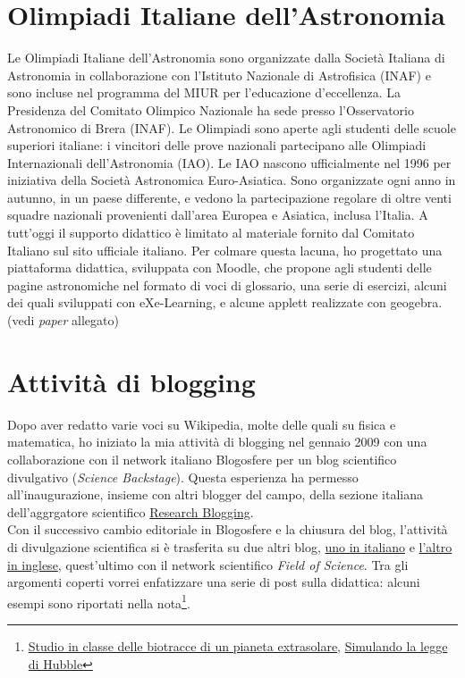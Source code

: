\documentclass[a4paper,latin1,italian]{article}
\begin{document}
\section{Olimpiadi Italiane dell'Astronomia}
Le Olimpiadi Italiane dell'Astronomia sono organizzate dalla Societ\`a Italiana di Astronomia in collaborazione con l'Istituto Nazionale di Astrofisica (INAF) e sono incluse nel programma del MIUR per l'educazione d'eccellenza. La Presidenza del Comitato Olimpico Nazionale ha sede presso l'Osservatorio Astronomico di Brera (INAF). Le Olimpiadi sono aperte agli studenti delle scuole superiori italiane: i vincitori delle prove nazionali partecipano alle Olimpiadi Internazionali dell'Astronomia (IAO). Le IAO nascono ufficialmente nel 1996 per iniziativa della Societ\`a Astronomica Euro-Asiatica. Sono organizzate ogni anno in autunno, in un paese differente, e vedono la partecipazione regolare di oltre venti squadre nazionali provenienti dall'area Europea e Asiatica, inclusa l'Italia. A tutt'oggi il supporto didattico \`e limitato al materiale fornito dal Comitato Italiano sul sito ufficiale italiano. Per colmare questa lacuna, ho progettato una piattaforma didattica, sviluppata con Moodle, che propone agli studenti delle pagine astronomiche nel formato di voci di glossario, una serie di esercizi, alcuni dei quali sviluppati con eXe-Learning, e alcune applett realizzate con geogebra.\\
(vedi {\em paper} allegato)

\section{Attivit\`a di blogging}
Dopo aver redatto varie voci su Wikipedia, molte delle quali su fisica e matematica, ho iniziato la mia attivit\`a di blogging nel gennaio 2009 con una collaborazione con il network italiano Blogosfere per un blog scientifico divulgativo (\emph{Science Backstage}). Questa esperienza ha permesso all'inaugurazione, insieme con altri blogger del campo, della sezione italiana dell'aggrgatore scientifico \href{http://researchblogging.org/}{Research Blogging}.\\
Con il successivo cambio editoriale in Blogosfere e la chiusura del blog, l'attivit\`a di divulgazione scientifica si \`e trasferita su due altri blog, \href{http://dropseaofulaula.blogspot.it/}{uno in italiano} e \href{http://docmadhattan.fieldofscience.com/}{l'altro in inglese}, quest'ultimo con il network scientifico {\em Field of Science}. Tra gli argomenti coperti vorrei enfatizzare una serie di post sulla didattica: alcuni esempi sono riportati nella nota\footnote{\href{http://dropseaofulaula.blogspot.it/2012/09/studio-in-classe-delle-biotracce-di-un.html}{Studio in classe delle biotracce di un pianeta extrasolare}, \href{http://dropseaofulaula.blogspot.it/2011/09/simulando-la-legge-di-hubble.html}{Simulando la legge di Hubble}}.
\end{document}
